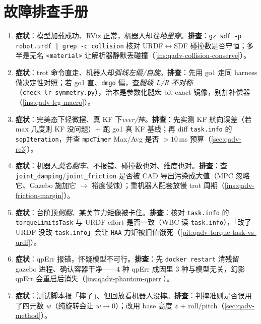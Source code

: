 \section*{故障排查手册}
\begin{enumerate}
  \item \textbf{症状}：模型加载成功、RViz 正常，机器人却\emph{往地里穿}。\textbf{排查}：\texttt{gz sdf -p robot.urdf | grep -c collision} 核对 URDF$\leftrightarrow$SDF 碰撞数是否守恒；多半是无名 \texttt{<material>} 让解析器静默丢碰撞（\cref{ins:qadv-collision-conserve}）。
  \item \textbf{症状}：trot 命令直走、机器人却\emph{弧线左偏/自旋}。\textbf{排查}：先用 go1 走同 harness 做决定性对照；若 go1 直、\texttt{dmgo} 偏，查\emph{腿级 L/R 不对称}（\texttt{check\_lr\_symmetry.py}），治本是参数化腿宏 bit-exact 镜像，别加补偿器（\cref{ins:qadv-leg-macro}）。
  \item \textbf{症状}：完美态下轻微摆、真 KF 下\emph{veer/摔}。\textbf{排查}：先实测 KF 航向误差（若 max 几度则 KF 没问题）+ 跑 go1 真 KF 基线；再 diff \texttt{task.info} 的 \texttt{sqpIteration}，并查 \texttt{mpcTimer} Max/Avg 是否 $>10$\,ms 预算（\cref{sec:qadv-rc3}）。
  \item \textbf{症状}：机器人\emph{莫名翻车}、不报错、碰撞数也对、维度也对。\textbf{排查}：查 \texttt{joint\_damping}/\texttt{joint\_friction} 是否被 CAD 导出污染成大值（MPC 忽略它、Gazebo 施加它 $\to$ 裕度侵蚀）；重机器人配套放慢 trot 周期（\cref{ins:qadv-friction-margin}）。
  \item \textbf{症状}：台阶顶\emph{侧翻}、某关节力矩像被卡住。\textbf{排查}：核对 \texttt{task.info} 的 \texttt{torqueLimitsTask} 与 URDF effort 是否一致（WBC 读 \texttt{task.info}），「改了 URDF 没改 \texttt{task.info}」会让 \texttt{HAA} 力矩被旧值饿死（\cref{pit:qadv-torque-task-vs-urdf}）。
  \item \textbf{症状}：qpErr 报错，怀疑模型不可行。\textbf{排查}：先 \texttt{docker restart} 清残留 gazebo 进程、确认容器干净——$4$ 种 qpErr 成因里 $3$ 种与模型无关，幻影 qpErr 会重启后消失（\cref{ins:qadv-phantom-qperr}）。
  \item \textbf{症状}：测试脚本报「摔了」、但回放看机器人没摔。\textbf{排查}：判摔准则是否误用了四元数 $w$（纯旋转会让 $w\to0$）；改用 base 高度 $z$ + roll/pitch（\cref{sec:qadv-method}）。
\end{enumerate}
